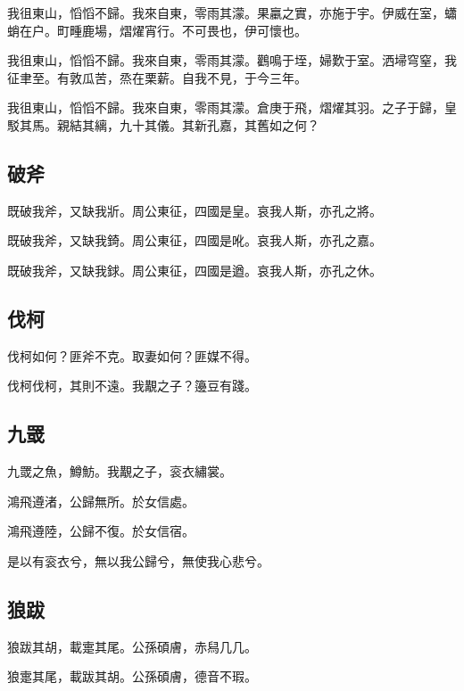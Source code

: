 我徂東山，慆慆不歸。我來自東，零雨其濛。果臝之實，亦施于宇。伊威在室，蠨蛸在户。町畽鹿場，熠燿宵行。不可畏也，伊可懷也。

我徂東山，慆慆不歸。我來自東，零雨其濛。鸛鳴于垤，婦歎于室。洒埽穹窒，我征聿至。有敦瓜苦，烝在栗薪。自我不見，于今三年。

我徂東山，慆慆不歸。我來自東，零雨其濛。倉庚于飛，熠燿其羽。之子于歸，皇駁其馬。親結其縭，九十其儀。其新孔嘉，其舊如之何？

\subsection[破斧]{破斧}

既破我斧，又缺我斨。周公東征，四國是皇。哀我人斯，亦孔之將。

既破我斧，又缺我錡。周公東征，四國是吪。哀我人斯，亦孔之嘉。

既破我斧，又缺我銶。周公東征，四國是遒。哀我人斯，亦孔之休。

\subsection[伐柯]{伐柯}

伐柯如何？匪斧不克。取妻如何？匪媒不得。

伐柯伐柯，其則不遠。我覯之子？籩豆有踐。

\subsection[九罭]{九罭}

九罭之魚，鱒魴。我覯之子，衮衣繡裳。

鴻飛遵渚，公歸無所。於女信處。

鴻飛遵陸，公歸不復。於女信宿。

是以有衮衣兮，無以我公歸兮，無使我心悲兮。

\subsection[狼跋]{狼跋}

狼跋其胡，載疐其尾。公孫碩膚，赤舄几几。

狼疐其尾，載跋其胡。公孫碩膚，德音不瑕。
